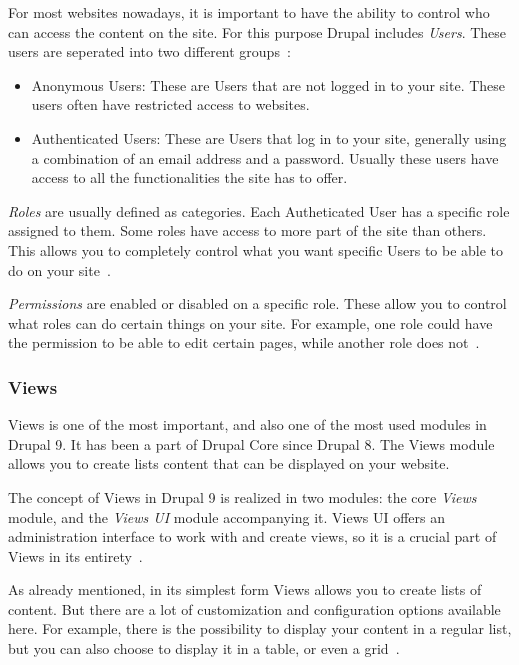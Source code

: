 For most websites nowadays, it is important to have the ability to control who can access the content on the site. For this purpose Drupal includes \emph{Users}. These users are seperated into two different groups~\autocite{Tomlinson2015}:
\begin{itemize}
	\item  Anonymous Users: These are Users that are not logged in to your site. These users often have restricted access to websites.
	\item  Authenticated Users: These are Users that log in to your site, generally using a combination of an email address and a password. Usually these users have access to all the functionalities the site has to offer.
\end{itemize}

\emph{Roles} are usually defined as categories. Each Autheticated User has a specific role assigned to them. Some roles have access to more part of the site than others. This allows you to completely control what you want specific Users to be able to do on your site~\autocite{Tomlinson2015}.

\emph{Permissions} are enabled or disabled on a specific role. These allow you to control what roles can do certain things on your site. For example, one role could have the permission to be able to edit certain pages, while another role does not~\autocite{Tomlinson2015}.

\subsubsection{Views}

Views is one of the most important, and also one of the most used modules in Drupal 9. It has been a part of Drupal Core since Drupal 8. The Views module allows you to create lists content that can be displayed on your website.

The concept of Views in Drupal 9 is realized in two modules: the core \emph{Views} module, and the \emph{Views UI} module accompanying it. Views UI offers an administration interface to work with and create views, so it is a crucial part of Views in its entirety~\autocite{Tomlinson2015}.

As already mentioned, in its simplest form Views allows you to create lists of content. But there are a lot of customization and configuration options available here. For example, there is the possibility to display your content in a regular list, but you can also choose to display it in a table, or even a grid~\autocite{Tomlinson2015}.

